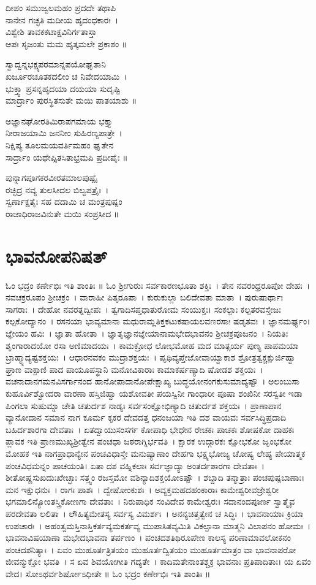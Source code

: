 ದೀಪಂ ಸಮುಜ್ವಲಮಹಂ ಪ್ರದದೇ ತಥಾಪಿ\\ ನಾನೇನ ಗಚ್ಛತಿ ಮದೀಯ ಹೃದಂಧಕಾರಃ~।\\
ವಿಶ್ವೇಶಿ ತಾವಕಕಟಾಕ್ಷವಿನಿರ್ಗತಾಸ್ತಾ \\ಆಪಃ ಸೃಜಂತು ಮಮ ಹೃತ್ಕಮಲೇ ಪ್ರಕಾಶಂ ॥

ಸ್ವಾದ್ವನ್ನಭಕ್ಷ್ಯಪರಮಾನ್ನಪಯೋಘೃತಾನಿ \\ಖರ್ಜೂರಚೂತಕದಲೀಂ ಚ ನಿವೇದಯಾಮಿ~।\\
ಭುಕ್ತ್ವಾ ಪ್ರಸನ್ನಹೃದಯಾ ದಯಯಾ ಸುದೃಷ್ಟಿ\-\\ಮಾರ್ದ್ರಾಂ ಪುರಸ್ಥಿತಸುತೇ ಮಯಿ ಪಾತಯಾಶು ॥

ಅಜ್ಞಾನಘೋರತಿಮಿರಾಪಗಮಾಯ ಭಕ್ತ್ಯಾ \\ನೀರಾಜಯಾಮಿ ಜನನೀಂ ಸುಹಿರಣ್ಯಪಾತ್ರೇ~।\\
ನಿಕ್ಷಿಪ್ಯ ತೂಲಮಯವರ್ತಿಮಹಂ ಘೃತೇನ \\ಸಾರ್ದ್ರಾಂ ಯಥೇಪ್ಸಿತಸಿತಾಭ್ರಮಪಿ ಪ್ರದೀಪೈಃ ॥

ಪುನ್ನಾಗಪೂಗಕರವೀರತಮಾಲಪುಷ್ಪೈ\-\\ರಚ್ಛಿದ್ರ ನವ್ಯ ತುಲಸೀದಲ ಬಿಲ್ವಪತ್ರೈಃ~।\\
ಸ್ವರ್ಣಾಕ್ಷತೈಃ ಸಹ ದದಾಮಿ ಚ ಮಂತ್ರಪುಷ್ಪಂ\\ ರಾಜಾಧಿರಾಜವಿನುತೇ ಮಯಿ ಸಂಪ್ರಸೀದ ॥
\section{ಭಾವನೋಪನಿಷತ್}
ಓಂ ಭದ್ರಂ ಕರ್ಣೇಭಿಃ ಇತಿ ಶಾಂತಿಃ ॥
ಓಂ ಶ್ರೀಗುರುಃ ಸರ್ವಕಾರಣಭೂತಾ ಶಕ್ತಿಃ~। ತೇನ ನವರಂಧ್ರರೂಪೋ ದೇಹಃ~। ನವಚಕ್ರರೂಪಂ ಶ್ರೀಚಕ್ರಂ~। ವಾರಾಹೀ ಪಿತೃರೂಪಾ~। ಕುರುಕುಲ್ಲಾ ಬಲಿದೇವತಾ ಮಾತಾ~। ಪುರುಷಾರ್ಥಾಃ ಸಾಗರಾಃ~। ದೇಹೋ ನವರತ್ನದ್ವೀಪಃ~। ತ್ವಗಾದಿಸಪ್ತಧಾತುರೋಮ ಸಂಯುಕ್ತಃ। ಸಂಕಲ್ಪಾಃ ಕಲ್ಪತರವಸ್ತೇಜಃ ಕಲ್ಪಕೋ\-ದ್ಯಾನಂ~। ರಸನಯಾ ಭಾವ್ಯಮಾನಾ ಮಧುರಾಮ್ಲತಿಕ್ತಕಟುಕಷಾಯಲವಣರಸಾಃ ಷಡೃತವಃ~। ಜ್ಞಾನಮರ್ಘ್ಯಂ। ಜ್ಞೇಯಂ ಹವಿಃ~। ಜ್ಞಾತಾ ಹೋತಾ~। ಜ್ಞಾತೃಜ್ಞಾನಜ್ಞೇಯಾನಾಮಭೇದಭಾವನಂ ಶ್ರೀಚಕ್ರಪೂಜನಂ~। ನಿಯತಿಃ ಶೃಂಗಾರಾದಯೋ ರಸಾ ಅಣಿಮಾದಯಃ~। ಕಾಮಕ್ರೋಧ ಲೋಭಮೋಹ ಮದ ಮಾತ್ಸರ್ಯ ಪುಣ್ಯ ಪಾಪಮಯಾ ಬ್ರಾಹ್ಮ್ಯಾದ್ಯಷ್ಟಶಕ್ತಯಃ~। ಆಧಾರನವಕಂ ಮುದ್ರಾಶಕ್ತಯಃ~। ಪೃಥಿವ್ಯಪ್ತೇಜೋವಾಯ್ವಾಕಾಶ ಶ್ರೋತ್ರತ್ವಕ್ಚಕ್ಷುರ್ಜಿಹ್ವಾ ಘ್ರಾಣ ವಾಕ್ಪಾಣಿ ಪಾದ ಪಾಯೂಪಸ್ಥಾನಿ ಮನೋವಿಕಾರಾಃ ಕಾಮಾಕರ್ಷಣ್ಯಾದಿ ಷೋಡಶ ಶಕ್ತಯಃ~। ವಚನಾದಾನಗಮನವಿಸರ್ಗಾನಂದ ಹಾನೋಪಾದಾನೋಪೇಕ್ಷಾಖ್ಯ ಬುದ್ಧಯೋನಂಗಕುಸುಮಾದ್ಯಷ್ಟೌ~। ಅಲಂಬುಸಾ ಕುಹೂರ್ವಿಶ್ವೋದರಾ ವಾರಣಾ ಹಸ್ತಿಜಿಹ್ವಾ ಯಶೋವತೀ ಪಯಸ್ವಿನೀ ಗಾಂಧಾರೀ ಪೂಷಾ ಶಂಖಿನೀ ಸರಸ್ವತೀ ಇಡಾ ಪಿಂಗಲಾ ಸುಷುಮ್ನಾ ಚೇತಿ ಚತುರ್ದಶ ನಾಡ್ಯಃ ಸರ್ವಸಂಕ್ಷೋಭಿಣ್ಯಾದಿ ಚತುರ್ದಶ ಶಕ್ತಯಃ~। ಪ್ರಾಣಾಪಾನ ವ್ಯಾನೋದಾನ ಸಮಾನ ನಾಗ ಕೂರ್ಮ ಕೃಕರ ದೇವದತ್ತ ಧನಂಜಯಾ ಇತಿ ದಶ ವಾಯವಃ ಸರ್ವಸಿದ್ಧಿಪ್ರದಾದಿ ಬಹಿರ್ದಶಾರಗಾ ದೇವತಾಃ~। ಏತದ್ವಾಯುಸಂಸರ್ಗ ಕೋಪಾಧಿ ಭೇಧೇನ ರೇಚಕಃ ಪಾಚಕಃ ಶೋಷಕೋ ದಾಹಕಃ ಪ್ಲಾವಕ ಇತಿ ಪ್ರಾಣಮುಖ್ಯಶ್ರೀತ್ವೇನ ಪಂಚಧಾ ಜಠರಾಗ್ನಿರ್ಭವತಿ~। ಕ್ಷಾರಕ ಉದ್ಗಾರಕಃ ಕ್ಷೋಭಕೋ ಜೃಂಭಕೋ ಮೋಹಕ ಇತಿ ನಾಗಪ್ರಾಧಾನ್ಯೇನ ಪಂಚವಿಧಾಸ್ತೇ ಮನುಷ್ಯಾಣಾಂ ದೇಹಗಾ ಭಕ್ಷ್ಯಭೋಜ್ಯ ಚೋಷ್ಯ ಲೇಹ್ಯ ಪೇಯಾತ್ಮಕ ಪಂಚವಿಧಮನ್ನಂ ಪಾಚಯಂತಿ। ಏತಾ ದಶ ವಹ್ನಿಕಲಾಃ ಸರ್ವಜ್ಞಾದ್ಯಾ ಅಂತರ್ದಶಾರಗಾ ದೇವತಾಃ~। ಶೀತೋಷ್ಣಸುಖದುಃಖೇಚ್ಛಾಃ ಸತ್ತ್ವಂ ರಜಸ್ತಮೋ ವಶಿನ್ಯಾದಿಶಕ್ತಯೋಽಷ್ಟೌ~। ಶಬ್ದಾದಿ ತನ್ಮಾತ್ರಾಃ ಪಂಚಪುಷ್ಪಬಾಣಾಃ। ಮನ ಇಕ್ಷುಧನುಃ~। ರಾಗಃ ಪಾಶಃ~। ದ್ವೇಷೋಂಕುಶಃ~। ಅವ್ಯಕ್ತಮಹದಹಂಕಾರಾಃ ಕಾಮೇಶ್ವರೀವಜ್ರೇಶ್ವರೀ ಭಗಮಾಲಿನ್ಯೋಂತಸ್ತ್ರಿಕೋಣಗಾ ದೇವತಾಃ~। ನಿರುಪಾಧಿಕ ಸಂವಿದೇವ ಕಾಮೇಶ್ವರಃ। ಸದಾನಂದಪೂರ್ಣ ಸ್ವಾತ್ಮೈವ ಪರದೇವತಾ ಲಲಿತಾ~। ಲೌಹಿತ್ಯಮೇತಸ್ಯ ಸರ್ವಸ್ಯ ವಿಮರ್ಶಃ~। ಅನನ್ಯಚಿತ್ತತ್ವೇನ ಚ ಸಿದ್ಧಿಃ~। ಭಾವನಾಯಾಃ ಕ್ರಿಯಾ ಉಪಚಾರಃ~। ಅಹಂತ್ವಮಸ್ತಿನಾಸ್ತಿಕರ್ತವ್ಯಮಕರ್ತವ್ಯ ಮುಪಾಸಿತವ್ಯಮಿತಿ ವಿಕಲ್ಪಾನಾ ಮಾತ್ಮನಿ ವಿಲಾಪನಂ ಹೋಮಃ~। ಭಾವನಾವಿಷಯಾಣಾ ಮಭೇದಭಾವನಾ ತರ್ಪಣಂ~। ಪಂಚದಶತಿಥಿರೂಪೇಣ ಕಾಲಸ್ಯ ಪರಿಣಾಮಾವಲೋಕನಂ ಪಂಚದಶನಿತ್ಯಾಃ~। ಏವಂ ಮುಹೂರ್ತತ್ರಿತಯಂ ಮುಹೂರ್ತದ್ವಿತಯಂ ಮುಹೂರ್ತಮಾತ್ರಂ ವಾ ಭಾವನಾಪರೋ ಜೀವನ್ಮುಕ್ತೋ ಭವತಿ~। ಸ ಏವ ಶಿವಯೋಗೀತಿ ಗದ್ಯತೇ~। ಕಾದಿಮತೇನಾಂತಶ್ಚಕ್ರ ಭಾವನಾಃ ಪ್ರತಿಪಾದಿತಾಃ। ಯ ಏವಂ ವೇದ। ಸೋಽಥರ್ವಶಿರ್ಷೋಽಧೀತೇ ॥ ಓಂ ಭದ್ರಂ ಕರ್ಣೇಭಿಃ ಇತಿ ಶಾಂತಿಃ ॥

